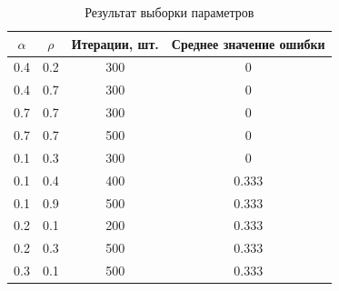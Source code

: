 \begin{table}[hbtp]
	\centering
	\caption{Результат выборки параметров}
	\label{tab:data_comparison}
	\begin{tabular}{|c|c|c|c|}
		\hline
		\textbf{$\alpha$} & {$\rho$} & {Итерации, шт.} & {Среднее значение ошибки} \\
		\hline
		0.4 & 0.2 & 300 & 0 \\
		0.4 & 0.7 & 300 & 0 \\
		0.7 & 0.7 & 300 & 0 \\
		0.7 & 0.7 & 500 & 0 \\
		0.1 & 0.3 & 300 & 0 \\
		0.1 & 0.4 & 400 & 0.333 \\
		0.1 & 0.9 & 500 & 0.333 \\
		0.2 & 0.1 & 200 & 0.333 \\
		0.2 & 0.3 & 500 & 0.333 \\
		0.3 & 0.1 & 500 & 0.333 \\
		\hline
	\end{tabular}
\end{table}
